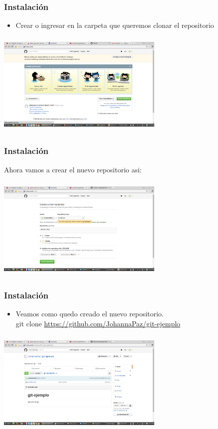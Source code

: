 \documentclass{beamer}
\begin{document}
	\begin{frame}
		\frametitle{Instalación}
		\begin{itemize}	
			\item Crear o ingresar en la carpeta que queremos clonar el repositorio
		\end{itemize}
		\begin{center}
			\includegraphics[width=8cm,height=5cm]{manual-img3.png}
		\end{center}
	\end{frame}
	
	\begin{frame}
		\frametitle{Instalación}
		Ahora vamos a crear el nuevo repositorio asi:
		\begin{center}
			\includegraphics[width=8cm,height=5cm]{manual-img4.png}
		\end{center}
	\end{frame}

	\begin{frame}
		\frametitle{Instalación}
		\begin{itemize}
		\item Veamos como quedo creado el nuevo repositorio.\\
		git clone \url{https://github.com/JohannaPaz/git-ejemplo}
		\end{itemize}
		\begin{center}
			\includegraphics[width=8cm,height=5cm]{manual-img5.png}
		\end{center}
	\end{frame}
\end{document}
